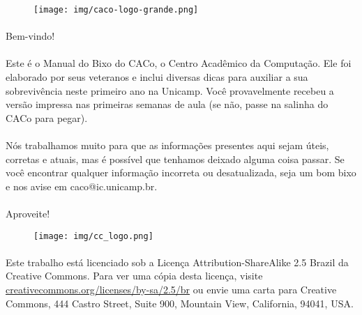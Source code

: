 \documentclass[a4paper,10pt, twocolumn, twoside, titlepage]{article}
\begin{document}
\thispagestyle{empty}

\hfill
\pagebreak[4]


\onecolumn

\begin{figure}
    \centering
    \texttt{[image: img/caco-logo-grande.png]}
\end{figure}

\paragraph{}
Bem-vindo!

\paragraph{}
Este é o Manual do Bixo do CACo, o Centro Acadêmico da Computação.
Ele foi elaborado por seus veteranos e inclui diversas dicas para auxiliar a sua
sobrevivência neste primeiro ano na Unicamp.
Você provavelmente recebeu a versão impressa nas primeiras semanas de aula (se
não, passe na salinha do CACo para pegar).

\paragraph{}
Nós trabalhamos muito para que as informações presentes aqui sejam úteis,
corretas e atuais, mas é possível que tenhamos deixado alguma coisa passar. Se
você encontrar qualquer informação incorreta ou desatualizada, seja um bom bixo
e nos avise em caco@ic.unicamp.br.

\paragraph{}
Aproveite!

\vfill %

\begin{figure}[H]
    \centering
    \texttt{[image: img/cc\_logo.png]}
\end{figure}

\paragraph{}
Este trabalho está licenciado sob a Licença Attribution-ShareAlike 2.5 Brazil
da Creative Commons. Para ver uma cópia desta licença,
visite \url{creativecommons.org/licenses/by-sa/2.5/br} ou envie uma
carta para Creative Commons, 444 Castro Street, Suite 900, Mountain View,
California, 94041, USA.
\end{document}
